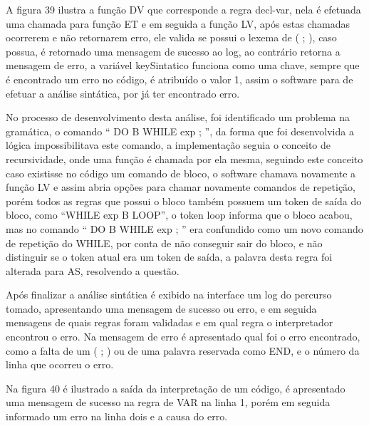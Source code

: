 \documentclass[12pt,oneside,a4paper,chapter=TITLE,section=TITLE,sumario=tradicional]{abntex2}
\begin{document}
A figura 39 ilustra a função DV que corresponde a regra decl-var, nela é efetuada uma chamada para função ET e em seguida a função LV, após estas chamadas ocorrerem e não retornarem erro, ele valida se possui o lexema de ( ; ), caso possua, é retornado uma mensagem de sucesso ao log, ao contrário retorna a mensagem de erro, a variável keySintatico funciona como uma chave, sempre que é encontrado um erro no código, é atribuído o valor 1, assim o software para de efetuar a análise sintática, por já ter encontrado erro. 

\begin{figure}[htb]
\end{figure} 

No processo de desenvolvimento desta análise, foi identificado um problema na gramática, o comando “ DO B WHILE exp ; ”, da forma que foi desenvolvida a lógica impossibilitava este comando, a implementação seguia o conceito de recursividade, onde uma função é chamada por ela mesma, seguindo este conceito caso existisse no código um comando de bloco, o software chamava novamente a função LV e assim abria opções para chamar novamente comandos de repetição, porém todos as regras que possui o bloco também possuem um token de saída do bloco, como “WHILE exp B LOOP”, o token loop informa que o bloco acabou, mas no comando “ DO B WHILE exp ; ” era confundido como um novo comando de repetição do WHILE, por conta de não conseguir sair do bloco, e não distinguir se o token atual era um token de saída, a palavra desta regra foi alterada para AS, resolvendo a questão.

Após finalizar a análise sintática é exibido na interface um log do percurso tomado, apresentando uma mensagem de sucesso ou erro, e em seguida mensagens de quais regras foram validadas e em qual regra o interpretador encontrou o erro.  Na mensagem de erro é apresentado qual foi o erro encontrado, como a falta de um ( ; ) ou de uma palavra reservada como END, e o número da linha que ocorreu o erro.

Na figura 40 é ilustrado a saída da interpretação de um código, é apresentado uma mensagem de sucesso na regra de VAR na linha 1, porém em seguida informado um erro na linha dois e a causa do erro.

\begin{figure}[htb]
\end{figure} 
\end{document}
